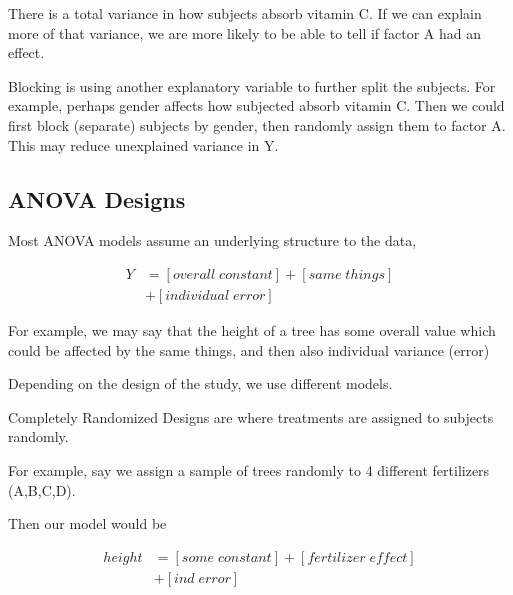 \documentclass[10pt]{article}
\newcommand{\define}[1]{\colorbox{Thistle2}{#1}}
\newcommand{\emphas}[1]{\colorbox{DarkSeaGreen2}{#1}}
\begin{document}
\begin{multicols}{3}
    There is a \emphas{total variance} in how subjects absorb vitamin C. If we can explain more of that variance, we are more likely to be able to tell if factor A had an effect.

    \define{Blocking} is using another explanatory variable to further split the subjects. For example, perhaps gender affects how subjected absorb vitamin C. Then we could first block (separate) subjects by gender, then randomly assign them to factor A. This may reduce unexplained variance in Y.

    \subsection{ANOVA Designs}

    Most ANOVA models assume an underlying structure to the data,

    \begin{align*}
        Y & = [overall \; constant] + [same \; things] \\
          & + [individual \; error]
    \end{align*}

    For example, we may say that the height of a tree has some \emphas{overall value} which could be affected by the \emphas{same things}, and then also \emphas{individual variance (error)}

    Depending on the design of the study, we use different models.

    \define{Completely Randomized Designs} are where treatments are assigned to subjects randomly.

    For example, say we assign a sample of trees randomly to 4 different fertilizers (A,B,C,D).

    Then our model would be 

    \begin{align*}
        height & = [some \; constant] + [fertilizer \; effect] \\
                & + [ind \; error]
    \end{align*}

\end{multicols}
\end{document}
